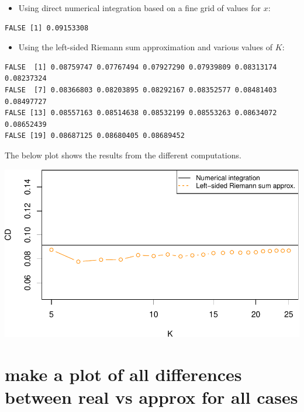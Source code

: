 \documentclass[
]{article}
\providecommand{\tightlist}{%
  \setlength{\itemsep}{0pt}\setlength{\parskip}{0pt}}
\begin{document}
\begin{itemize}
\tightlist
\item
  Using direct numerical integration based on a fine grid of values for
  \(x\):
\end{itemize}

\begin{verbatim}
FALSE [1] 0.09153308
\end{verbatim}

\begin{itemize}
\tightlist
\item
  Using the left-sided Riemann sum approximation and various values of
  \(K\):
\end{itemize}

\begin{verbatim}
FALSE  [1] 0.08759747 0.07767494 0.07927290 0.07939809 0.08313174 0.08237324
FALSE  [7] 0.08366803 0.08203895 0.08292167 0.08352577 0.08481403 0.08497727
FALSE [13] 0.08557163 0.08514638 0.08532199 0.08553263 0.08634072 0.08652439
FALSE [19] 0.08687125 0.08680405 0.08689452
\end{verbatim}

The below plot shows the results from the different computations.

\begin{center}\includegraphics{cd_approx_2_files/figure-latex/unnamed-chunk-15-1} \end{center}

\hypertarget{make-a-plot-of-all-differences-between-real-vs-approx-for-all-cases}{%
\section{make a plot of all differences between real vs approx for all
cases}\label{make-a-plot-of-all-differences-between-real-vs-approx-for-all-cases}}
\end{document}
